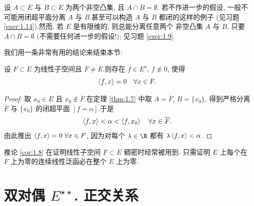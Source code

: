 \begin{remark}
\label{rem:1.4}
设 $A\subset E$ 与 $B\subset E$ 为两个非空凸集, 且 $A\cap B=\emptyset$.
若不作进一步的假设, 一般不可能用闭超平面分离 $A$ 与 $B$.甚至可以构造 $A$ 与 $B$
都闭的这样的例子 (见习题  \ref{exer:1.14}).然而, 若 $E$ 是有限维的, 则总能分离任意两个
非空凸集 $A$ 与 $B$, 只要 $A\cap B=\emptyset$ (不需要任何进一步的假设!); 见习题
 \ref{exer:1.9}.
\end{remark}

我们用一条非常有用的结论来结束本节:

\begin{keycorollary}
\label{cor:1.8}
设 $F\subset E$ 为线性子空间且 $\overline{F}\ne E$.则存在 $f\in E^\star$, $f\not\equiv 0$,
使得
\begin{equation*}
\left\langle f,x\right\rangle=0\quad \forall x\in F.
\end{equation*}
\end{keycorollary}

\begin{proof}
取 $x_0\in E$ 且 $x_0\notin\overline{F}$.在定理  \ref{thm:1.7} 中取
$A=\overline{F}$, $B=\{x_0\}$, 得到严格分离 $\overline{F}$ 与 $\{x_0\}$ 的闭超平面
$[f=\alpha]$.于是
\begin{equation*}
\left\langle f,x\right\rangle<\alpha<\left\langle f,x_0\right\rangle\quad \forall x\in\overline{F}.
\end{equation*}
由此推出 $\left\langle f,x\right\rangle=0\ \forall x\in F$, 因为对每个 $\lambda\in\R$ 都有
$\lambda\left\langle f,x\right\rangle<\alpha$.
\end{proof}

\begin{keyremark}
\label{rem:1.5}
推论  \ref{cor:1.8} 在证明线性子空间 $F\subset E$ 稠密时经常被用到.
只需证明 $E$ 上每个在 $F$ 上为零的连续线性泛函必在整个 $E$ 上为零.
\end{keyremark}

\section{双对偶 $E^{\star\star}$. 正交关系}
\label{sec:1.3}

